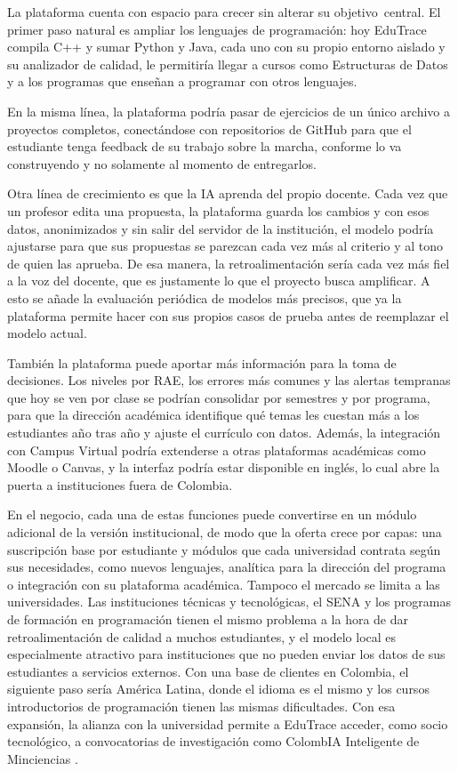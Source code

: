 \documentclass[letterpaper, 10 pt, conference]{ieeeconf}
\begin{document}
La plataforma cuenta con espacio para crecer sin alterar su objetivo central.
El primer paso natural es ampliar los lenguajes de programación: hoy EduTrace compila C++ y sumar Python y Java, cada uno con su propio entorno aislado y su analizador de calidad, le permitiría llegar a cursos como Estructuras de Datos y a los programas que enseñan a programar con otros lenguajes.

En la misma línea, la plataforma podría pasar de ejercicios de un único archivo a proyectos completos, conectándose con repositorios de GitHub para que el estudiante tenga feedback de su trabajo sobre la marcha, conforme lo va construyendo y no solamente al momento de entregarlos.

Otra línea de crecimiento es que la IA aprenda del propio docente.
Cada vez que un profesor edita una propuesta, la plataforma guarda los cambios y con esos datos, anonimizados y sin salir del servidor de la institución, el modelo podría ajustarse para que sus propuestas se parezcan cada vez más al criterio y al tono de quien las aprueba.
De esa manera, la retroalimentación sería cada vez más fiel a la voz del docente, que es justamente lo que el proyecto busca amplificar.
A esto se añade la evaluación periódica de modelos más precisos, que ya la plataforma permite hacer con sus propios casos de prueba antes de reemplazar el modelo actual.

También la plataforma puede aportar más información para la toma de decisiones.
Los niveles por RAE, los errores más comunes y las alertas tempranas que hoy se ven por clase se podrían consolidar por semestres y por programa, para que la dirección académica identifique qué temas les cuestan más a los estudiantes año tras año y ajuste el currículo con datos.
Además, la integración con Campus Virtual podría extenderse a otras plataformas académicas como Moodle o Canvas, y la interfaz podría estar disponible en inglés, lo cual abre la puerta a instituciones fuera de Colombia.

En el negocio, cada una de estas funciones puede convertirse en un módulo adicional de la versión institucional, de modo que la oferta crece por capas: una suscripción base por estudiante y módulos que cada universidad contrata según sus necesidades, como nuevos lenguajes, analítica para la dirección del programa o integración con su plataforma académica.
Tampoco el mercado se limita a las universidades.
Las instituciones técnicas y tecnológicas, el SENA y los programas de formación en programación tienen el mismo problema a la hora de dar retroalimentación de calidad a muchos estudiantes, y el modelo local es especialmente atractivo para instituciones que no pueden enviar los datos de sus estudiantes a servicios externos.
Con una base de clientes en Colombia, el siguiente paso sería América Latina, donde el idioma es el mismo y los cursos introductorios de programación tienen las mismas dificultades.
Con esa expansión, la alianza con la universidad permite a EduTrace acceder, como socio tecnológico, a convocatorias de investigación como ColombIA Inteligente de Minciencias \cite{35}.
\end{document}
